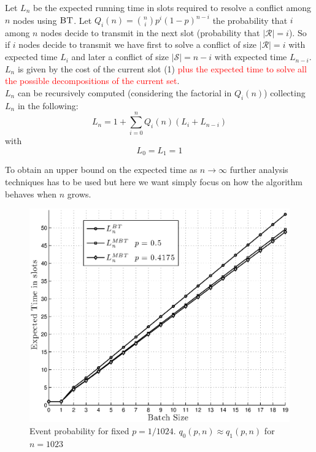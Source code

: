 \documentclass[12pt,a4paper]{report}
\newcommand{\algname}[1]{\ensuremath{\mbox{\sc #1}}}
\begin{document}
Let $L_{n}$ be the expected running time in slots required to resolve a conflict among $n$ nodes using \algname{BT}.
Let $Q_{i}(n)={n\choose i} p^{i} (1-p)^{n-i}$ the probability that $i$ among $n$ nodes decide to transmit in the next slot (probability that $|\mathcal{R}|=i$). So if $i$ nodes decide to transmit we have first to solve a conflict of size $|\mathcal{R}|=i$ with expected time $L_{i}$ and later a conflict of size $|\mathcal{S}|=n-i$ with expected time $L_{n-i}$. $L_{n}$ is given by the cost of the current slot (1) \textcolor{red}{plus the expected time to solve all the possible decompositions of the current set}.\\
$L_{n}$ can be recursively computed (considering the factorial in $Q_{i}(n)$) collecting  $L_{n}$ in the following:
\begin{equation}
L_{n} = 1 + \sum_{i=0}^{n} Q_{i}(n) (L_{i}+L_{n-i})
\end{equation}
with
\begin{equation*}
L_{0} = L_{1}  = 1
\end{equation*}

To obtain an upper bound on the expected time as $ n \rightarrow \infty$ further analysis techniques has to be used but here we want simply focus on how the algorithm behaves when $n$ grows.\\


\begin{figure}[H]
\begin{center}
\includegraphics[scale=.7]{matlab/BTs/bin-trees-expected-time}
\caption[Expected Running time for tree algorithms]{Event probability for fixed $p=1/1024$.  $q_{0}(p,n) \approx  q_{1}(p,n)$ for $n=1023$}
\end{center}
\end{figure}
\end{document}
